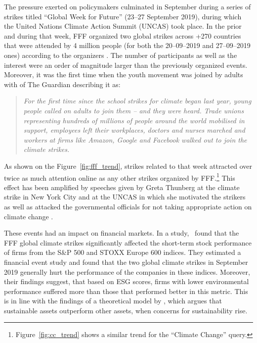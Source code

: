 \documentclass[12pt]{article}
\begin{document}
The pressure exerted on policymakers culminated in September during a series of strikes titled ``Global Week for Future'' (23--27 September 2019), during which the United Nations Climate Action Summit (UNCAS) took place. In the prior and during that week, FFF organized two global strikes across +270 countries that were attended by 4 million people (for both the 20--09--2019 and 27--09--2019 ones) according to the organizers \parencite{fffStrikeStats}. The number of participants as well as the interest were an order of magnitude larger than the previously organized events. Moreover, it was the first time when the youth movement was joined by adults with \citeauthor{watts2019climate} of The Guardian describing it as:

\begin{quote}
    \small
    \textit{For the first time since the school strikes for climate began last year, young people called on adults to join them – and they were heard. Trade unions representing hundreds of millions of people around the world mobilised in support, employees left their workplaces, doctors and nurses marched and workers at firms like Amazon, Google and Facebook walked out to join the climate strikes.} \parencite{watts2019climate}
\end{quote}

As shown on the Figure~\ref{fig:fff_trend}, strikes related to that week attracted over twice as much attention online as any other strikes organized by FFF.\footnote{Figure~\ref{fig:cc_trend} shows a similar trend for the ``Climate Change'' query.} This effect has been amplified by speeches given by Greta Thunberg at the climate strike in New York City and at the UNCAS in which she motivated the strikers as well as attacked the governmental officials for not taking appropriate action on climate change \parencite{2019thunberg}. 

These events had an impact on financial markets. In a \citeyear{schusterStockPriceReactions2023} study,~\citeauthor{schusterStockPriceReactions2023} found that the FFF global climate strikes significantly affected the short-term stock performance of firms from the S\&P 500 and STOXX Europe 600 indices. They estimated a financial event study and found that the two global climate strikes in September 2019 generally hurt the performance of the companies in these indices. Moreover, their findings suggest, that based on ESG scores, firms with lower environmental performance suffered more than those that performed better in this metric.  This is in line with the findings of a theoretical model by \textcite{pastorSustainableInvestingEquilibrium2021}, which argues that sustainable assets outperform other assets, when concerns for sustainability rise.
\end{document}
